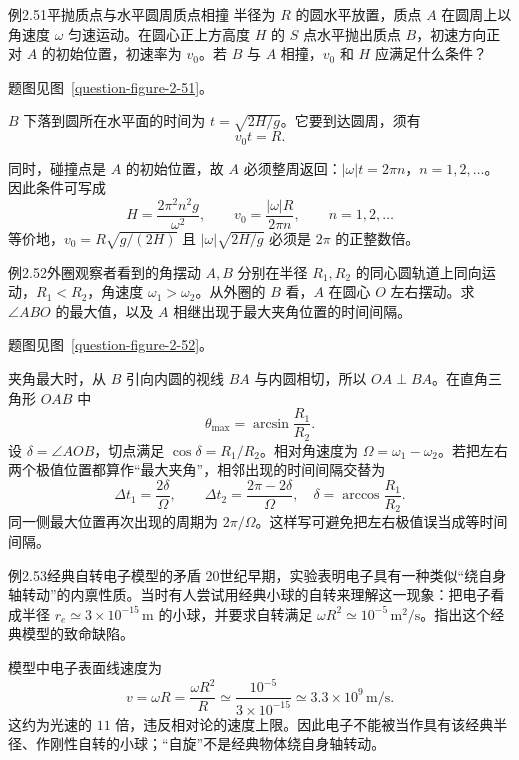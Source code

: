 \begin{origexamplebox}{例2.51\quad 平抛质点与水平圆周质点相撞}
半径为 $R$ 的圆水平放置，质点 $A$ 在圆周上以角速度 $\omega$ 匀速运动。在圆心正上方高度 $H$ 的 $S$ 点水平抛出质点 $B$，初速方向正对 $A$ 的初始位置，初速率为 $v_0$。若 $B$ 与 $A$ 相撞，$v_0$ 和 $H$ 应满足什么条件？
\par 题图见图~\ref{question-figure-2-51}。
\KQuestionBZ
\end{origexamplebox}
\begin{xesolution}
$B$ 下落到圆所在水平面的时间为 $t=\sqrt{2H/g}$。它要到达圆周，须有
\[
 v_0t=R.
\]
\ProjectileCircleCollisionDiagram

同时，碰撞点是 $A$ 的初始位置，故 $A$ 必须整周返回：$|\omega|t=2\pi n$，$n=1,2,\ldots$。因此条件可写成
\[
 \boxed{H=\frac{2\pi^2n^2g}{\omega^2}},\qquad
 \boxed{v_0=\frac{|\omega|R}{2\pi n}},\qquad n=1,2,\ldots
\]
等价地，$v_0=R\sqrt{g/(2H)}$ 且 $|\omega|\sqrt{2H/g}$ 必须是 $2\pi$ 的正整数倍。
\end{xesolution}

\begin{origexamplebox}{例2.52\quad 外圈观察者看到的角摆动}
$A,B$ 分别在半径 $R_1,R_2$ 的同心圆轨道上同向运动，$R_1<R_2$，角速度 $\omega_1>\omega_2$。从外圈的 $B$ 看，$A$ 在圆心 $O$ 左右摆动。求 $\angle ABO$ 的最大值，以及 $A$ 相继出现于最大夹角位置的时间间隔。
\par 题图见图~\ref{question-figure-2-52}。
\KQuestionCA
\end{origexamplebox}
\begin{xesolution}
夹角最大时，从 $B$ 引向内圆的视线 $BA$ 与内圆相切，所以 $OA\perp BA$。在直角三角形 $OAB$ 中
\ConcentricSightDiagram
\[
 \boxed{\theta_{\max}=\arcsin\frac{R_1}{R_2}}.
\]
设 $\delta=\angle AOB$，切点满足 $\cos\delta=R_1/R_2$。相对角速度为 $\Omega=\omega_1-\omega_2$。若把左右两个极值位置都算作“最大夹角”，相邻出现的时间间隔交替为
\[
 \boxed{\Delta t_1=\frac{2\delta}{\Omega},\qquad
 \Delta t_2=\frac{2\pi-2\delta}{\Omega}},
 \quad \delta=\arccos\frac{R_1}{R_2}.
\]
同一侧最大位置再次出现的周期为 $\boxed{2\pi/\Omega}$。这样写可避免把左右极值误当成等时间间隔。
\end{xesolution}

\begin{origexamplebox}{例2.53\quad 经典自转电子模型的矛盾}
20世纪早期，实验表明电子具有一种类似“绕自身轴转动”的内禀性质。当时有人尝试用经典小球的自转来理解这一现象：把电子看成半径 $r_e\simeq3\times10^{-15}\,\mathrm m$ 的小球，并要求自转满足 $\omega R^2\simeq10^{-5}\,\mathrm{m^2/s}$。指出这个经典模型的致命缺陷。
\end{origexamplebox}
\begin{xesolution}
模型中电子表面线速度为
\[
 v=\omega R=\frac{\omega R^2}{R}
 \simeq\frac{10^{-5}}{3\times10^{-15}}
 \simeq3.3\times10^9\,\mathrm{m/s}.
\]
这约为光速的 $11$ 倍，违反相对论的速度上限。因此电子不能被当作具有该经典半径、作刚性自转的小球；“自旋”不是经典物体绕自身轴转动。
\end{xesolution}

